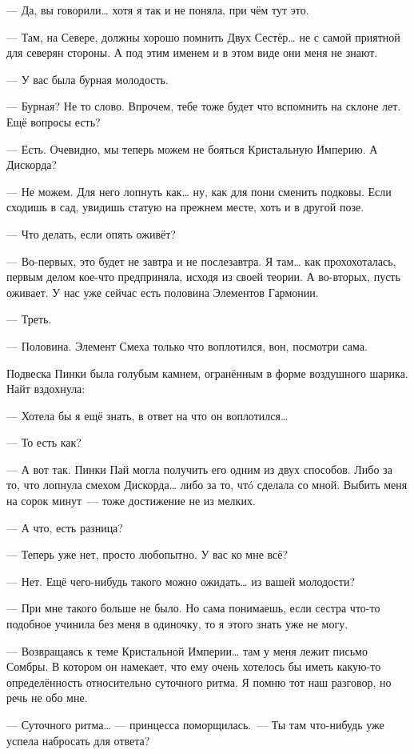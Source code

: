 \documentclass[twoside,a5paper,12pt]{extbook}
\begin{document}
— Да, вы говорили… хотя я так и не поняла, при чём тут это.

— Там, на Севере, должны хорошо помнить Двух Сестёр… не с самой приятной для северян стороны. А под этим именем и в этом виде они меня не знают.

— У вас была бурная молодость.

— Бурная? Не то слово. Впрочем, тебе тоже будет что вспомнить на склоне лет. Ещё вопросы есть?

— Есть. Очевидно, мы теперь можем не бояться Кристальную Империю. А Дискорда?

— Не можем. Для него лопнуть как… ну, как для пони сменить подковы. Если сходишь в сад, увидишь статую на прежнем месте, хоть и в другой позе.

— Что делать, если опять оживёт?

— Во-первых, это будет не завтра и не послезавтра. Я там… как прохохоталась, первым делом кое-что предприняла, исходя из своей теории. А во-вторых, пусть оживает. У нас уже сейчас есть половина Элементов Гармонии.

— Треть.

— Половина. Элемент Смеха только что воплотился, вон, посмотри сама.

Подвеска Пинки была голубым камнем, огранённым в форме воздушного шарика. Найт вздохнула:

— Хотела бы я ещё знать, в ответ на что он воплотился…

— То есть как?

— А вот так. Пинки Пай могла получить его одним из двух способов. Либо за то, что лопнула смехом Дискорда… либо за то, чтó сделала со мной. Выбить меня на сорок минут — тоже достижение не из мелких.

— А что, есть разница?

— Теперь уже нет, просто любопытно. У вас ко мне всё?

— Нет. Ещё чего-нибудь такого можно ожидать… из вашей молодости?

— При мне такого больше не было. Но сама понимаешь, если сестра что-то подобное учинила без меня в одиночку, то я этого знать уже не могу.

— Возвращаясь к теме Кристальной Империи… там у меня лежит письмо Сомбры. В котором он намекает, что ему очень хотелось бы иметь какую-то определённость относительно суточного ритма. Я помню тот наш разговор, но речь не обо мне.

— Суточного ритма… — принцесса поморщилась. — Ты там что-нибудь уже успела набросать для ответа?
\end{document}
